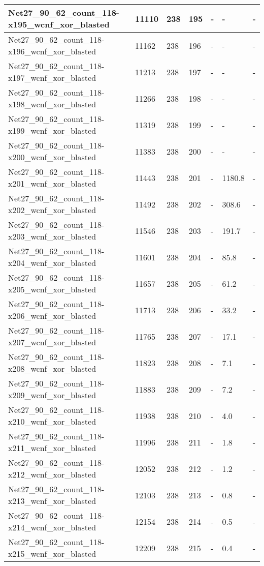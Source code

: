 \begin{scriptsize}
\begin{longtable}{|p{5cm}|l|l|l|l|l|l|}
Net27\_90\_62\_count\_118-x195\_wcnf\_xor\_blasted&11110&238&195&-&-&- \\ \hline 
Net27\_90\_62\_count\_118-x196\_wcnf\_xor\_blasted&11162&238&196&-&-&- \\ \hline 
Net27\_90\_62\_count\_118-x197\_wcnf\_xor\_blasted&11213&238&197&-&-&- \\ \hline 
Net27\_90\_62\_count\_118-x198\_wcnf\_xor\_blasted&11266&238&198&-&-&- \\ \hline 
Net27\_90\_62\_count\_118-x199\_wcnf\_xor\_blasted&11319&238&199&-&-&- \\ \hline 
Net27\_90\_62\_count\_118-x200\_wcnf\_xor\_blasted&11383&238&200&-&-&- \\ \hline 
Net27\_90\_62\_count\_118-x201\_wcnf\_xor\_blasted&11443&238&201&-&1180.8&- \\ \hline 
Net27\_90\_62\_count\_118-x202\_wcnf\_xor\_blasted&11492&238&202&-&308.6&- \\ \hline 
Net27\_90\_62\_count\_118-x203\_wcnf\_xor\_blasted&11546&238&203&-&191.7&- \\ \hline 
Net27\_90\_62\_count\_118-x204\_wcnf\_xor\_blasted&11601&238&204&-&85.8&- \\ \hline 
Net27\_90\_62\_count\_118-x205\_wcnf\_xor\_blasted&11657&238&205&-&61.2&- \\ \hline 
Net27\_90\_62\_count\_118-x206\_wcnf\_xor\_blasted&11713&238&206&-&33.2&- \\ \hline 
Net27\_90\_62\_count\_118-x207\_wcnf\_xor\_blasted&11765&238&207&-&17.1&- \\ \hline 
Net27\_90\_62\_count\_118-x208\_wcnf\_xor\_blasted&11823&238&208&-&7.1&- \\ \hline 
Net27\_90\_62\_count\_118-x209\_wcnf\_xor\_blasted&11883&238&209&-&7.2&- \\ \hline 
Net27\_90\_62\_count\_118-x210\_wcnf\_xor\_blasted&11938&238&210&-&4.0&- \\ \hline 
Net27\_90\_62\_count\_118-x211\_wcnf\_xor\_blasted&11996&238&211&-&1.8&- \\ \hline 
Net27\_90\_62\_count\_118-x212\_wcnf\_xor\_blasted&12052&238&212&-&1.2&- \\ \hline 
Net27\_90\_62\_count\_118-x213\_wcnf\_xor\_blasted&12103&238&213&-&0.8&- \\ \hline 
Net27\_90\_62\_count\_118-x214\_wcnf\_xor\_blasted&12154&238&214&-&0.5&- \\ \hline 
Net27\_90\_62\_count\_118-x215\_wcnf\_xor\_blasted&12209&238&215&-&0.4&- \\ \hline 

\end{longtable}
\end{scriptsize}
